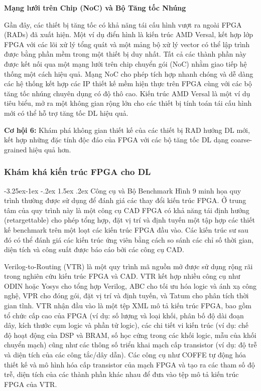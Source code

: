 \documentclass[a4paper]{article}
\makeatletter
\newcounter {subsubsubsection}[subsubsection]
\newcommand\subsubsubsection{\@startsection{subsubsubsection}{4}{\z@}%
                                     {-3.25ex\@plus -1ex \@minus -.2ex}%
                                     {1.5ex \@plus .2ex}%
                                     {\normalfont\normalsize\bfseries}}
\makeatother
\begin{document}
\textbf{Mạng lưới trên Chip (NoC) và Bộ Tăng tốc Nhúng}

Gần đây, các thiết bị tăng tốc có khả năng tái cấu hình vượt ra ngoài FPGA (RADs) đã xuất hiện. Một ví dụ điển hình là kiến trúc AMD Versal, kết hợp lớp FPGA với các lõi xử lý tổng quát và một mảng bộ xử lý vector có thể lập trình được bằng phần mềm trong một thiết bị duy nhất. Tất cả các thành phần này được kết nối qua một mạng lưới trên chip chuyển gói (NoC) nhằm giao tiếp hệ thống một cách hiệu quả. Mạng NoC cho phép tích hợp nhanh chóng và dễ dàng các hệ thống kết hợp các IP thiết kế mềm hiện thực trên FPGA cùng với các bộ tăng tốc nhúng chuyên dụng có độ thô cao. Kiến trúc AMD Versal là một ví dụ tiêu biểu, mở ra một không gian rộng lớn cho các thiết bị tính toán tái cấu hình mới có thể hỗ trợ tăng tốc DL hiệu quả.

\textbf{Cơ hội 6:} Khám phá không gian thiết kế của các thiết bị RAD hướng DL mới, kết hợp những đặc tính độc đáo của FPGA với các bộ tăng tốc DL dạng coarse-grained hiệu quả hơn.

\subsubsection{Khám khá kiến trúc FPGA cho DL}
\subsubsubsection{Công cụ và Bộ Benchmark}
Hình 9 minh họa quy trình thường được sử dụng để đánh giá các thay đổi kiến trúc FPGA. Ở trung tâm của quy trình này là một công cụ CAD FPGA có khả năng tái định hướng (retargettable) cho phép tổng hợp, đặt vị trí và định tuyến một tập hợp các thiết kế benchmark trên một loạt các kiến trúc FPGA đầu vào. Các kiến trúc sư sau đó có thể đánh giá các kiến trúc ứng viên bằng cách so sánh các chỉ số thời gian, diện tích và công suất được báo cáo bởi các công cụ CAD.

Verilog-to-Routing (VTR) là một quy trình mã nguồn mở được sử dụng rộng rãi trong nghiên cứu kiến trúc FPGA và CAD. VTR kết hợp nhiều công cụ như ODIN hoặc Yosys cho tổng hợp Verilog, ABC cho tối ưu hóa logic và ánh xạ công nghệ, VPR cho đóng gói, đặt vị trí và định tuyến, và Tatum cho phân tích thời gian tĩnh. VTR nhận đầu vào là một tệp XML mô tả kiến trúc FPGA, bao gồm tổ chức cấp cao của FPGA (ví dụ: số lượng và loại khối, phân bố độ dài đoạn dây, kích thước cụm logic và phần tử logic), các chi tiết vi kiến trúc (ví dụ: chế độ hoạt động của DSP và BRAM, số học cứng trong các khối logic, mẫu của khối chuyển mạch) cũng như các thông số triển khai mạch cấp transistor (ví dụ: độ trễ và diện tích của các công tắc/dây dẫn). Các công cụ như COFFE tự động hóa thiết kế và mô hình hóa cấp transistor của mạch FPGA và tạo ra các tham số độ trễ, diện tích của các thành phần khác nhau để đưa vào tệp mô tả kiến trúc FPGA của VTR.
\end{document}
